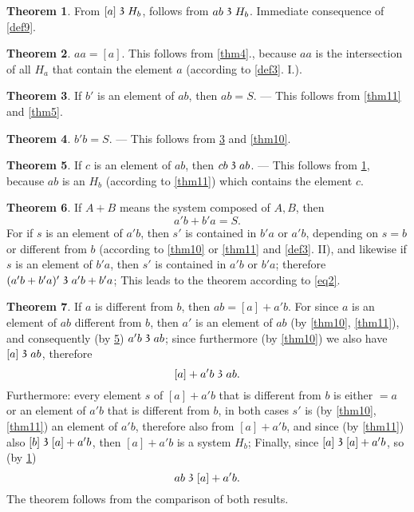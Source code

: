 \documentclass[leqno, hidelinks]{article}
\theoremstyle{definition}
\newtheorem{theorem}{Theorem}
\newcommand\partof{\mathrel{\raisebox{0.45ex}{$\mathfrak{3}$}}}
\begin{document}
\begin{theorem}\label{thm12}
 From $[a] \partof H_b$, follows from $ab \partof H_b$.
Immediate consequence of \ref{def9}.
\end{theorem}

\begin{theorem}\label{thm13}
$aa = [a]$.
This follows from \ref{thm4}., because $aa$ is the intersection of all $H_a$ that contain the element $a$ (according to \ref{def3}. I.).
\end{theorem}

\begin{theorem}\label{thm14}
If $b'$ is an element of $ab$, then $ab = S$.
--- This follows from \ref{thm11} and \ref{thm5}.
\end{theorem}


\begin{theorem}\label{thm15}
 $b' b = S$.
 --- This follows from \ref{thm14} and \ref{thm10}.
\end{theorem}

\begin{theorem}\label{thm16}
If $c$ is an element of $ab$, then $cb \partof ab$.
--- This follows from \ref{thm12}, because $ab$ is an $H_b$ (according to \ref{thm11}) which contains the element $c$.
\end{theorem}

\begin{theorem}\label{thm17}
If $A + B$ means the system composed of $A, B$, then
\[
	a'b + b'a = S.
\]
For if $s$ is an element of $a'b$, then $s'$ is contained in $b'a$ or $a'b$, depending on $s = b$ or different from $b$ (according to \ref{thm10} or \ref{thm11} and \ref{def3}. II), and likewise if $s$ is an element of $b'a$, then $s'$ is contained in $a'b$ or $b'a$; therefore $(a'b + b'a)' \partof a'b + b'a$; This leads to the theorem according to \eqref{eq2}.
\end{theorem}

\begin{theorem}\label{thm18}
If $a$ is different from $b$, then $ab = [a] + a'b$.
For since $a$ is an element of $ab$ different from $b$, then $a'$ is an element of $ab$ (by \ref{thm10}, \ref{thm11}), and consequently (by \ref{thm16}) $a'b \partof ab$; since furthermore (by \ref{thm10}) we also have $[a] \partof ab$, therefore
\[
	[a] + a'b \partof ab.
\]
Furthermore: every element $s$ of $[a] + a'b$ that is different from $b$ is either $= a$ or an element of $a'b$ that is different from $b$, in both cases $s'$ is (by \ref{thm10}, \ref{thm11}) an element of $a'b$, therefore also from $[a]+ a'b$, and since (by \ref{thm11}) also $[b] \partof [a] + a'b$, then $[a] + a'b$ is a system $H_b$; Finally, since $[a] \partof [a] + a'b$, so (by \ref{thm12})
\[
	ab \partof [a] + a' b.
\]
The theorem follows from the comparison of both results.
\end{theorem}
\end{document}

